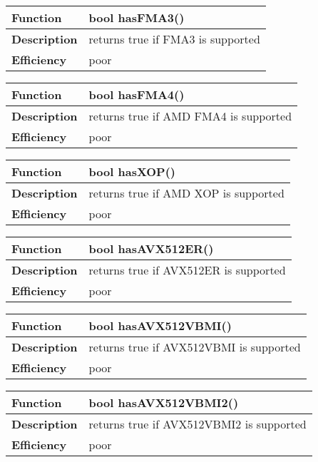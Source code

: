\documentclass[vcl_manual.tex]{subfiles}
\begin{document}
\begin{tabular}{|p{25mm}|p{100mm}|}
\hline
\bfseries Function & bool hasFMA3() \\ \hline
\bfseries Description & returns true if FMA3 is supported \\ \hline
 \bfseries Efficiency & poor \\ \hline
\end{tabular}


\begin{tabular}{|p{25mm}|p{100mm}|}
\hline
\bfseries Function & bool hasFMA4() \\ \hline
\bfseries Description & returns true if AMD FMA4 is supported \\ \hline
 \bfseries Efficiency & poor \\ \hline
\end{tabular}


\begin{tabular}{|p{25mm}|p{100mm}|}
\hline
\bfseries Function & bool hasXOP() \\ \hline
\bfseries Description & returns true if AMD XOP is supported \\ \hline
 \bfseries Efficiency & poor \\ \hline
\end{tabular}


\begin{tabular}{|p{25mm}|p{100mm}|}
\hline
\bfseries Function & bool hasAVX512ER() \\ \hline
\bfseries Description & returns true if AVX512ER is supported \\ \hline
 \bfseries Efficiency & poor \\ \hline
\end{tabular}

\begin{tabular}{|p{25mm}|p{100mm}|}
\hline
\bfseries Function & bool hasAVX512VBMI() \\ \hline
\bfseries Description & returns true if AVX512VBMI is supported \\ \hline
 \bfseries Efficiency & poor \\ \hline
\end{tabular}

\begin{tabular}{|p{25mm}|p{100mm}|}
\hline
\bfseries Function & bool hasAVX512VBMI2() \\ \hline
\bfseries Description & returns true if AVX512VBMI2 is supported \\ \hline
 \bfseries Efficiency & poor \\ \hline
\end{tabular}
\end{document}
